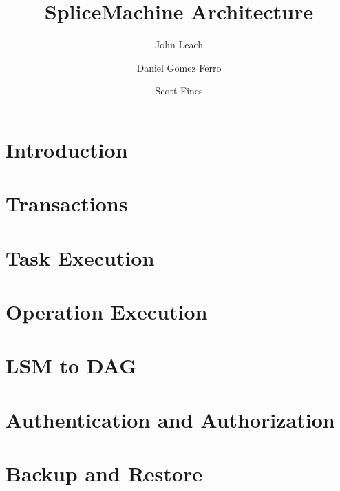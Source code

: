 \documentclass[10pt]{amsbook}
\begin{document}
\title{SpliceMachine Architecture}
\author{John Leach}
\author{Daniel Gomez Ferro}
\author{Scott Fines}

\maketitle
\begingroup
\let\clearpage\relax
\chapter*{Introduction}

\endgroup

\tableofcontents
\begingroup
\let\clearpage\relax
\chapter{Transactions}

\chapter{Task Execution}

\chapter{Operation Execution}

\chapter{LSM to DAG}

\chapter{Authentication and Authorization}


\chapter{Backup and Restore}


\endgroup
\end{document}
